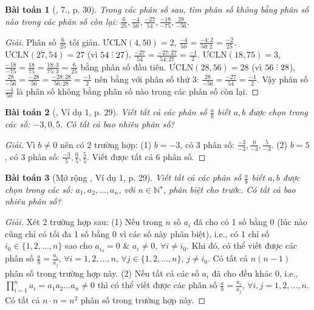 \documentclass{article}
\newtheorem{baitoan}{Bài toán}
\DeclareRobustCommand{\divby}{%
	\mathrel{\vbox{\baselineskip.65ex\lineskiplimit0pt\hbox{.}\hbox{.}\hbox{.}}}%
}
\begin{document}
\begin{baitoan}[\cite{SGK_Toan_6_Canh_Dieu_tap_2}, 7., p. 30]
	Trong các phân số sau, tìm phân số không bằng phân số nào trong các phân số còn lại: $\frac{6}{25},\frac{-4}{50},\frac{-27}{54},\frac{-18}{-75},\frac{28}{-56}$.
\end{baitoan}

\begin{proof}[Giải]
	Phân số $\frac{6}{25}$ tối giản. $\mbox{ƯCLN}(4,50) = 2$, $\frac{-4}{50} = \frac{-4:2}{50:2} = \frac{-2}{25}$. $\mbox{ƯCLN}(27,54) = 27$ (vì $54\divby27$), $\frac{-27}{54} = \frac{-27:27}{54:27} = \frac{-1}{2}$. $\mbox{ƯCLN}(18,75) = 3$, $\frac{-18}{-75} = \frac{18}{75} = \frac{18:3}{75:3} = \frac{6}{25}$ bằng phân số đầu tiên. $\mbox{ƯCLN}(28,56) = 28$ (vì $56\divby28$), $\frac{28}{-56} = \frac{-28}{56} = \frac{-28:28}{56:28} = \frac{-1}{2}$ nên bằng với phân số thứ 3: $\frac{28}{-56} = \frac{-27}{54}= \frac{-1}{2}$. Vậy phân số $\frac{-4}{50}$ là phân số không bằng phân số nào trong các phân số còn lại.
\end{proof}

\begin{baitoan}[\cite{SBT_Toan_6_Canh_Dieu_tap_2}, Ví dụ 1, p. 29]
	Viết tất cả các phân số $\frac{a}{b}$ biết $a,b$ được chọn trong các số: $-3,0,5$. Có tất cả bao nhiêu phân số?
\end{baitoan}

\begin{proof}[Giải]
	Vì $b\ne0$ nên có 2 trường hợp: (1) $b = -3$, có 3 phân số: $\frac{-3}{-3},\frac{0}{-3},\frac{5}{-3}$. (2) $b = 5$, có $3$ phân số: $\frac{-3}{5},\frac{0}{5},\frac{5}{5}$. Viết được tất cả $6$ phân số.
\end{proof}

\begin{baitoan}[Mở rộng \cite{SBT_Toan_6_Canh_Dieu_tap_2}, Ví dụ 1, p. 29]
	Viết tất cả các phân số $\frac{a}{b}$ biết $a,b$ được chọn trong các số: $a_1,a_2,\ldots,a_n$, với $n\in\mathbb{N}^\star$, phân biệt cho trước. Có tất cả bao nhiêu phân số?
\end{baitoan}

\begin{proof}[Giải]
	Xét 2 trường hợp sau: (1) Nếu trong $n$ số $a_i$ đã cho có 1 số bằng $0$ (lúc nào cũng chỉ có tối đa 1 số bằng $0$ vì các số này phân biệt), i.e., có 1 chỉ số $i_0\in\{1,2,\ldots,n\}$ sao cho $a_{i_0} = 0$ \& $a_i\ne0$, $\forall i\ne i_0$.  Khi đó, có thể viết được các phân số $\frac{a}{b} = \frac{a_i}{a_j}$, $\forall i = 1,2,\ldots,n$, $\forall j\in\{1,2,\ldots,n\}$, $j\ne i_0$. Có tất cả $n(n - 1)$ phân số trong trường hợp này. (2) Nếu tất cả các số $a_i$ đã cho đều khác $0$, i.e., $\prod_{i=1}^n a_i = a_1a_2\ldots a_n\ne0$ thì có thể viết được các phân số $\frac{a}{b} = \frac{a_i}{a_j}$, $\forall i,j = 1,2,\ldots,n$. Có tất cả $n\cdot n = n^2$ phân số trong trường hợp này.
\end{proof}
\end{document}
